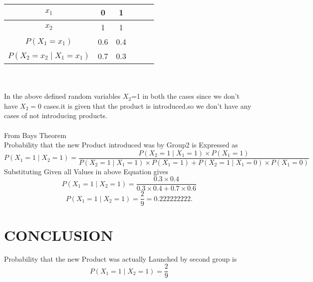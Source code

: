\documentclass[journal,12pt,twocolumn]{IEEEtran}
\begin{document}
 \begin{tabular}{|c|c|c|c|c|c|}
\hline
   $x_1$  & 0 & 1 \\
\hline
   $x_2$ & 1 & 1 \\
\hline
 $ P(X_1=x_1)$ & 0.6 & 0.4 \\
\hline
 $P(X_2=x_2\mid X_1=x_1)$ & 0.7 & 0.3\\
\hline
\end{tabular}\\ \\
In the above defined random variables $X_2$=1 in both the cases since we don't have $X_2=0$ cases.it is given that the product is introduced.so we don't have any cases of not introducing products.\\ \\
From Bays Theorem \\
Probability that the new Product introduced was by Group2 is Expressed as
\begin{equation*}
   P(X_1=1\mid X_2=1)=\frac{P(X_2=1\mid X_1=1)\times P(X_1=1)}{{P(X_2=1\mid X_1=1)\times P(X_1=1)}+{P(X_2=1\mid X_1=0)\times P(X_1=0)}}
\end{equation*}
Substituting Given all Values in above Equation gives
\begin{equation*}
    P(X_1=1\mid X_2=1)=\frac{0.3\times 0.4}{{0.3\times 0.4}+{0.7\times 0.6}}
\end{equation*}
\begin{equation*}
    P(X_1=1\mid X_2=1)=\frac{2}{9}=0.222222222.
\end{equation*}
\section{CONCLUSION}
Probability that the new Product was actually Launched by second group is 
\begin{equation*}
   P(X_1=1\mid X_2=1)=\frac{2}{9}
\end{equation*}
\end{document}
